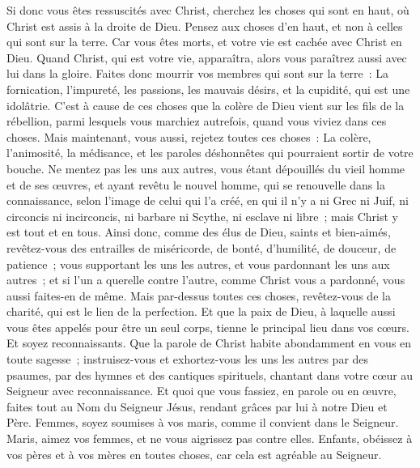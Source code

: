 \begin{multicols}{2}
\VerseOne{}Si donc vous êtes ressuscités avec Christ, cherchez les choses qui sont en haut, où Christ est assis à la droite de Dieu.
Pensez aux choses d'en haut, et non à celles qui sont sur la terre.
Car vous êtes morts, et votre vie est cachée avec Christ en Dieu.
Quand Christ, qui est votre vie, apparaîtra, alors vous paraîtrez aussi avec lui dans la gloire.
Faites donc mourrir vos membres qui sont sur la terre~: La fornication, l'impureté, les passions, les mauvais désirs, et la cupidité, qui est une idolâtrie.
C'est à cause de ces choses que la colère de Dieu vient sur les fils de la rébellion,
parmi lesquels vous marchiez autrefois, quand vous viviez dans ces choses.
Mais maintenant, vous aussi, rejetez toutes ces choses~: La colère, l'animosité, la médisance, et les paroles déshonnêtes qui pourraient sortir de votre bouche.
Ne mentez pas les uns aux autres, vous étant dépouillés du vieil homme et de ses œuvres,
et ayant revêtu le nouvel homme, qui se renouvelle dans la connaissance, selon l'image de celui qui l'a créé,
en qui il n'y a ni Grec ni Juif, ni circoncis ni incirconcis, ni barbare ni Scythe, ni esclave ni libre~; mais Christ y est tout et en tous.
Ainsi donc, comme des élus de Dieu, saints et bien-aimés, revêtez-vous des entrailles de miséricorde, de bonté, d'humilité, de douceur, de patience~;
vous supportant les uns les autres, et vous pardonnant les uns aux autres~; et si l'un a querelle contre l'autre, comme Christ vous a pardonné, vous aussi faites-en de même.
Mais par-dessus toutes ces choses, revêtez-vous de la charité, qui est le lien de la perfection.
Et que la paix de Dieu, à laquelle aussi vous êtes appelés pour être un seul corps, tienne le principal lieu dans vos cœurs. Et soyez reconnaissants.
Que la parole de Christ habite abondamment en vous en toute sagesse~; instruisez-vous et exhortez-vous les uns les autres par des psaumes, par des hymnes et des cantiques spirituels, chantant dans votre cœur au Seigneur avec reconnaissance.
Et quoi que vous fassiez, en parole ou en œuvre, faites tout au Nom du Seigneur Jésus, rendant grâces par lui à notre Dieu et Père.
Femmes, soyez soumises à vos maris, comme il convient dans le Seigneur.
Maris, aimez vos femmes, et ne vous aigrissez pas contre elles.
Enfants, obéissez à vos pères et à vos mères en toutes choses, car cela est agréable au Seigneur.

\end{multicols}
